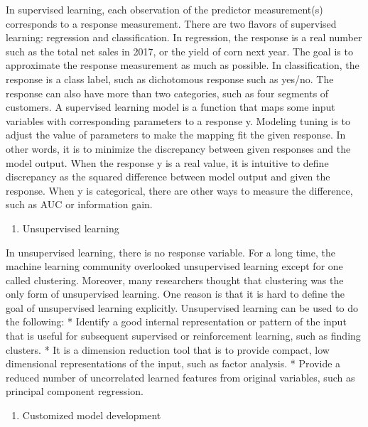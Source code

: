 \documentclass[12pt,]{krantz}
\providecommand{\tightlist}{%
  \setlength{\itemsep}{0pt}\setlength{\parskip}{0pt}}
\theoremstyle{definition}
\theoremstyle{definition}
\theoremstyle{definition}
\theoremstyle{remark}
\begin{document}
In supervised learning, each observation of the predictor measurement(s)
corresponds to a response measurement. There are two flavors of
supervised learning: regression and classification. In regression, the
response is a real number such as the total net sales in 2017, or the
yield of corn next year. The goal is to approximate the response
measurement as much as possible. In classification, the response is a
class label, such as dichotomous response such as yes/no. The response
can also have more than two categories, such as four segments of
customers. A supervised learning model is a function that maps some
input variables with corresponding parameters to a response y. Modeling
tuning is to adjust the value of parameters to make the mapping fit the
given response. In other words, it is to minimize the discrepancy
between given responses and the model output. When the response y is a
real value, it is intuitive to define discrepancy as the squared
difference between model output and given the response. When y is
categorical, there are other ways to measure the difference, such as AUC
or information gain.

\begin{enumerate}
\def\labelenumi{(\arabic{enumi})}
\setcounter{enumi}{1}
\tightlist
\item
  Unsupervised learning
\end{enumerate}

In unsupervised learning, there is no response variable. For a long
time, the machine learning community overlooked unsupervised learning
except for one called clustering. Moreover, many researchers thought
that clustering was the only form of unsupervised learning. One reason
is that it is hard to define the goal of unsupervised learning
explicitly. Unsupervised learning can be used to do the following: *
Identify a good internal representation or pattern of the input that is
useful for subsequent supervised or reinforcement learning, such as
finding clusters. * It is a dimension reduction tool that is to provide
compact, low dimensional representations of the input, such as factor
analysis. * Provide a reduced number of uncorrelated learned features
from original variables, such as principal component regression.

\begin{enumerate}
\def\labelenumi{(\arabic{enumi})}
\setcounter{enumi}{2}
\tightlist
\item
  Customized model development
\end{enumerate}
\end{document}
